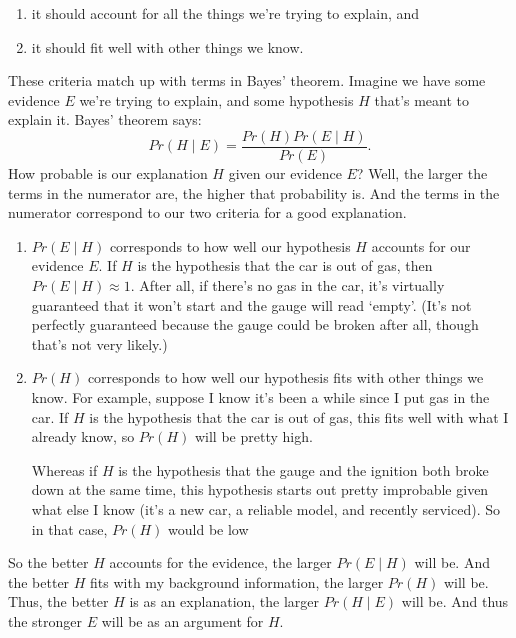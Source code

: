 \documentclass[justified]{tufte-book}
\providecommand{\tightlist}{%
  \setlength{\itemsep}{0pt}\setlength{\parskip}{0pt}}
\newcommand{\given}{\mid}
\newcommand{\p}{Pr}
\theoremstyle{definition}
\theoremstyle{definition}
\theoremstyle{definition}
\theoremstyle{remark}
\begin{document}
\begin{enumerate}
\def\labelenumi{\arabic{enumi}.}
\tightlist
\item
  it should account for all the things we're trying to explain, and
\item
  it should fit well with other things we know.
\end{enumerate}

These criteria match up with terms in Bayes' theorem. Imagine we have
some evidence \(E\) we're trying to explain, and some hypothesis \(H\)
that's meant to explain it. Bayes' theorem says:
\[ \p(H \given E) = \frac{\p(H)\p(E \given H)}{\p(E)}. \] How probable
is our explanation \(H\) given our evidence \(E\)? Well, the larger the
terms in the numerator are, the higher that probability is. And the
terms in the numerator correspond to our two criteria for a good
explanation.

\begin{enumerate}
\def\labelenumi{\arabic{enumi}.}
\item
  \(\p(E \given H)\) corresponds to how well our hypothesis \(H\)
  accounts for our evidence \(E\). If \(H\) is the hypothesis that the
  car is out of gas, then \(\p(E \given H) \approx 1\). After all, if
  there's no gas in the car, it's virtually guaranteed that it won't
  start and the gauge will read `empty'. (It's not perfectly guaranteed
  because the gauge could be broken after all, though that's not very
  likely.)
\item
  \(\p(H)\) corresponds to how well our hypothesis fits with other
  things we know. For example, suppose I know it's been a while since I
  put gas in the car. If \(H\) is the hypothesis that the car is out of
  gas, this fits well with what I already know, so \(\p(H)\) will be
  pretty high.

  Whereas if \(H\) is the hypothesis that the gauge and the ignition
  both broke down at the same time, this hypothesis starts out pretty
  improbable given what else I know (it's a new car, a reliable model,
  and recently serviced). So in that case, \(\p(H)\) would be low
\end{enumerate}

So the better \(H\) accounts for the evidence, the larger
\(\p(E \given H)\) will be. And the better \(H\) fits with my background
information, the larger \(\p(H)\) will be. Thus, the better \(H\) is as
an explanation, the larger \(\p(H \given E)\) will be. And thus the
stronger \(E\) will be as an argument for \(H\).
\end{document}
